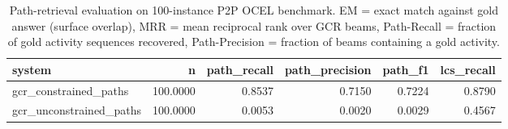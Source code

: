 \begin{table}
\caption{Path-retrieval evaluation on 100-instance P2P OCEL benchmark. EM = exact match against gold answer (surface overlap), MRR = mean reciprocal rank over GCR beams, Path-Recall = fraction of gold activity sequences recovered, Path-Precision = fraction of beams containing a gold activity.}
\label{tab:path_results}
\begin{tabular}{lrrrrr}
\toprule
system & n & path_recall & path_precision & path_f1 & lcs_recall \\
\midrule
gcr_constrained_paths & 100.0000 & 0.8537 & 0.7150 & 0.7224 & 0.8790 \\
gcr_unconstrained_paths & 100.0000 & 0.0053 & 0.0020 & 0.0029 & 0.4567 \\
\bottomrule
\end{tabular}
\end{table}
